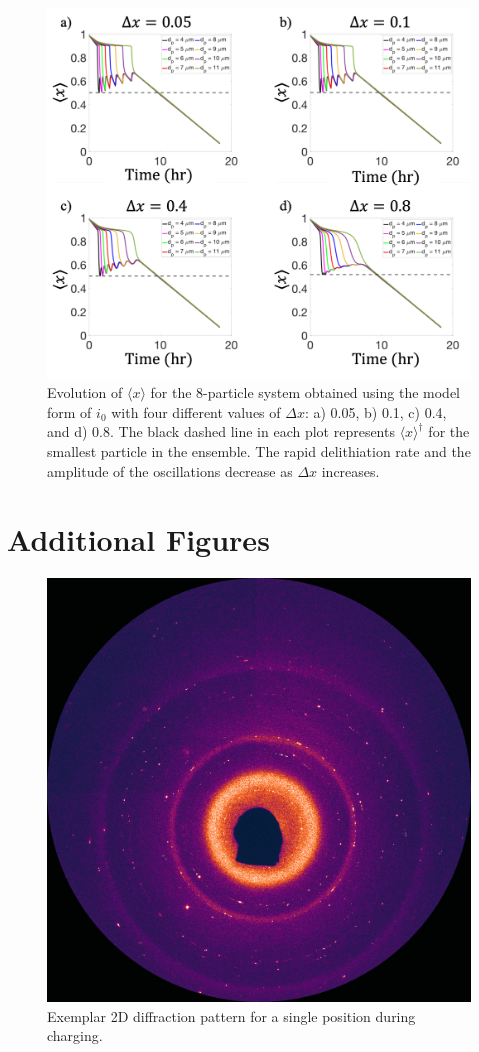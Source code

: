 \documentclass{article}
\begin{document}
\begin{figure}
  \includegraphics[width=\textwidth]{8-particle-evolution-deltax.png}
  \caption{Evolution of $\langle x\rangle$ for the
    8-particle system obtained using the model form of $i_0$ with
    four different values of $\Delta x$: a) 0.05, b) 0.1, c) 0.4, and d)
    0.8. The black dashed line in each plot represents
    $\langle x \rangle^\dag$ for the smallest particle in
    the ensemble. The rapid delithiation rate and the amplitude of
    the oscillations decrease as $\Delta x$ increases.}
  \label{fig:delta-x-sensitivity}
\end{figure}

\section{Additional Figures}

\begin{figure}
  \centering
  \includegraphics[width=0.5\linewidth]{figures/2D-diffraction.png}
  \caption{Exemplar 2D diffraction pattern for a single position
    during charging.}
  \label{fig:2Ddiffraction}
\end{figure}
\end{document}
